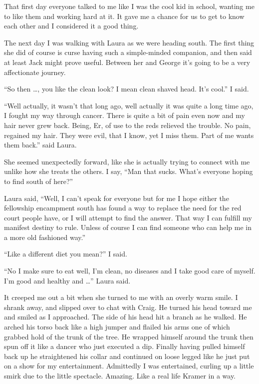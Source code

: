 That first day everyone talked to me like I was the cool kid in school, wanting me to like them and working hard at it. It gave me a chance for us to get to know each other and I considered it a good thing.

The next day I was walking with Laura as we were heading south. The first thing she did of course is curse having such a simple-minded companion, and then said at least Jack might prove useful. Between her and George it's going to be a very affectionate journey.

``So then \dots , you like the clean look? I mean clean shaved head. It's cool.'' I said.

``Well actually, it wasn't that long ago, well actually it was quite a long time ago, I fought my way through cancer. There is quite a bit of pain even now and my hair never grew back. Being, Er, of use to the reds relieved the trouble. No pain, regained my hair. They were evil, that I know, yet I miss them. Part of me wants them back.'' said Laura.

She seemed unexpectedly forward, like she is actually trying to connect with me unlike how she treats the others. I say, ``Man that sucks. What's everyone hoping to find south of here?''

Laura said, ``Well, I can't speak for everyone but for me I hope either the fellowship encampment south has found a way to replace the need for the red court people have, or I will attempt to find the answer. That way I can fulfill my manifest destiny to rule. Unless of course I can find someone who can help me in a more old fashioned way.''

``Like a different diet you mean?'' I said.

``No I make sure to eat well, I'm clean, no diseases and I take good care of myself. I'm good and healthy and \dots'' Laura said.

It creeped me out a bit when she turned to me with an overly warm smile. I shrank away, and slipped over to chat with Craig. He turned his head toward me and smiled as I approached. The side of his head hit a branch as he walked. He arched his torso back like a high jumper and flailed his arms one of which grabbed hold of the trunk of the tree. He wrapped himself around the trunk then spun off it like a dancer who just executed a dip. Finally having pulled himself back up he straightened his collar and continued on loose legged like he just put on a show for my entertainment. Admittedly I was entertained, curling up a little smirk due to the little spectacle. Amazing. Like a real life Kramer in a way.


